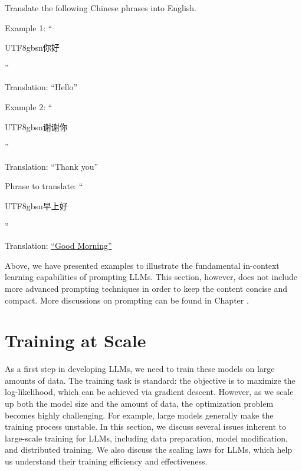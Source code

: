 \vspace{0.5em}
\begin{tcolorbox}
\begin{center}
\parbox{0.9\textwidth}
{

{\color{blue} Translate the following Chinese phrases into English.}

\vspace{0.5em}

{\color{ugreen} Example 1: ``\begin{CJK*}{UTF8}{gbsn}你好\end{CJK*}''}

{\color{ugreen} Translation: ``Hello''}

\vspace{0.3em}

{\color{ugreen} Example 2: ``\begin{CJK*}{UTF8}{gbsn}谢谢你\end{CJK*}''}

{\color{ugreen} Translation: ``Thank you''}

\vspace{0.5em}

{\color{blue} Phrase to translate: ``\begin{CJK*}{UTF8}{gbsn}早上好\end{CJK*}''}

{\color{blue} Translation:} \underline{``Good Morning''}

}
\end{center}
\end{tcolorbox}
\vspace{0.5em}

Above, we have presented examples to illustrate the fundamental in-context learning capabilities of prompting LLMs. This section, however, does not include more advanced prompting techniques in order to keep the content concise and compact. More discussions on prompting can be found in Chapter \ChapterLLMPrompting.


\section{Training at Scale}
\label{sec:llm-training-at-scale}

\noindent As a first step in developing LLMs, we need to train these models on large amounts of data. The training task is standard: the objective is to maximize the log-likelihood, which can be achieved via gradient descent. However, as we scale up both the model size and the amount of data, the optimization problem becomes highly challenging. For example, large models generally make the training process unstable. In this section, we discuss several issues inherent to large-scale training for LLMs, including data preparation, model modification, and distributed training. We also discuss the scaling laws for LLMs, which help us understand their training efficiency and effectiveness.

